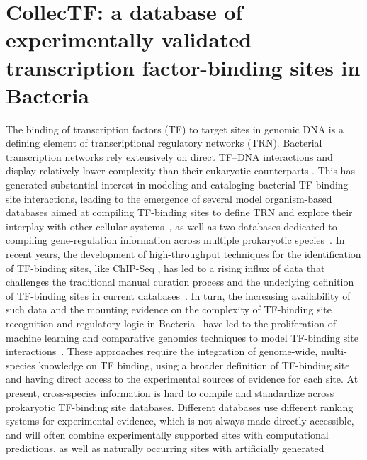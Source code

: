 
\chapter{CollecTF: a database of experimentally validated transcription
  factor-binding sites in Bacteria}

The binding of transcription factors (TF) to target sites in genomic DNA is a
defining element of transcriptional regulatory networks (TRN). Bacterial
transcription networks rely extensively on direct TF–DNA interactions and
display relatively lower complexity than their eukaryotic counterparts
\citep{wunderlich2009different, remenyi2004combinatorial}. This has generated
substantial interest in modeling and cataloging bacterial TF-binding site
interactions, leading to the emergence of several model organism-based
databases aimed at compiling TF-binding sites to define TRN and explore their
interplay with other cellular systems~\citep{salgado2013regulondb,
  jacques2005mtbreglist, pauling2012coryneregnet, sierro2008dbtbs}, as well as
two databases dedicated to compiling gene-regulation information across
multiple prokaryotic species~\citep{munch2005virtual,
  kazakov2007regtransbase}. In recent years, the development of high-throughput
techniques for the identification of TF-binding sites, like ChIP-Seq
\citep{mardis2007chip}, has led to a rising influx of data that challenges the
traditional manual curation process and the underlying definition of TF-binding
sites in current databases~\citep{salgado2013regulondb}. In turn, the increasing
availability of such data and the mounting evidence on the complexity of
TF-binding site recognition and regulatory logic in
Bacteria~\citep{hijum2009mechanisms, paul2007integration, barnard2004regulation}
have led to the proliferation of machine learning and comparative genomics
techniques to model TF-binding site interactions~\citep{narlikar2013mumod,
  maienschein2012improved, zwir2005dissecting}. These approaches require the
integration of genome-wide, multi-species knowledge on TF binding, using a
broader definition of TF-binding site and having direct access to the
experimental sources of evidence for each site. At present, cross-species
information is hard to compile and standardize across prokaryotic TF-binding
site databases. Different databases use different ranking systems for
experimental evidence, which is not always made directly accessible, and will
often combine experimentally supported sites with computational predictions, as
well as naturally occurring sites with artificially generated

